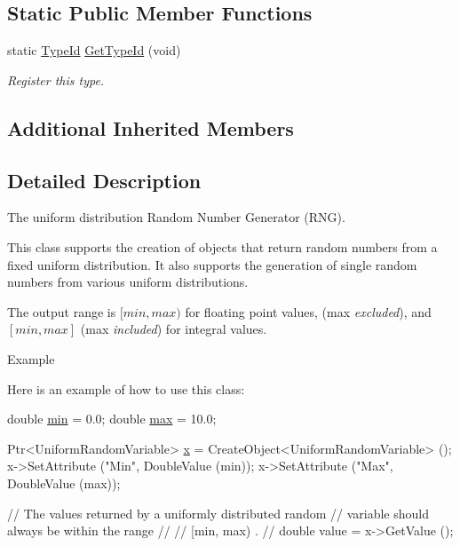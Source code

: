 \subsection*{Static Public Member Functions}
\begin{DoxyCompactItemize}
\item 
static \hyperlink{classns3_1_1TypeId}{Type\+Id} \hyperlink{classns3_1_1UniformRandomVariable_a972caf9fb5d1cdde200ba9cf7307c73e}{Get\+Type\+Id} (void)
\begin{DoxyCompactList}\small\item\em Register this type. \end{DoxyCompactList}\end{DoxyCompactItemize}
\subsection*{Additional Inherited Members}


\subsection{Detailed Description}
The uniform distribution Random Number Generator (R\+NG). 

This class supports the creation of objects that return random numbers from a fixed uniform distribution. It also supports the generation of single random numbers from various uniform distributions.

The output range is $[min, max)$ for floating point values, ({\ttfamily max} {\itshape excluded}), and $[min, max]$ ({\ttfamily max} {\itshape included}) for integral values.

\begin{DoxyParagraph}{Example}

\end{DoxyParagraph}
Here is an example of how to use this class\+: 
\begin{DoxyCode}
\textcolor{keywordtype}{double} \hyperlink{80211b_8c_ac6afabdc09a49a433ee19d8a9486056d}{min} = 0.0;
\textcolor{keywordtype}{double} \hyperlink{80211b_8c_affe776513b24d84b39af8ab0930fef7f}{max} = 10.0;

Ptr<UniformRandomVariable> \hyperlink{lte__link__budget__x2__handover__measures_8m_a9336ebf25087d91c818ee6e9ec29f8c1}{x} = CreateObject<UniformRandomVariable> ();
x->SetAttribute (\textcolor{stringliteral}{"Min"}, DoubleValue (min));
x->SetAttribute (\textcolor{stringliteral}{"Max"}, DoubleValue (max));

\textcolor{comment}{// The values returned by a uniformly distributed random}
\textcolor{comment}{// variable should always be within the range}
\textcolor{comment}{//}
\textcolor{comment}{//     [min, max)  .}
\textcolor{comment}{//}
\textcolor{keywordtype}{double} value = x->GetValue ();
\end{DoxyCode}


